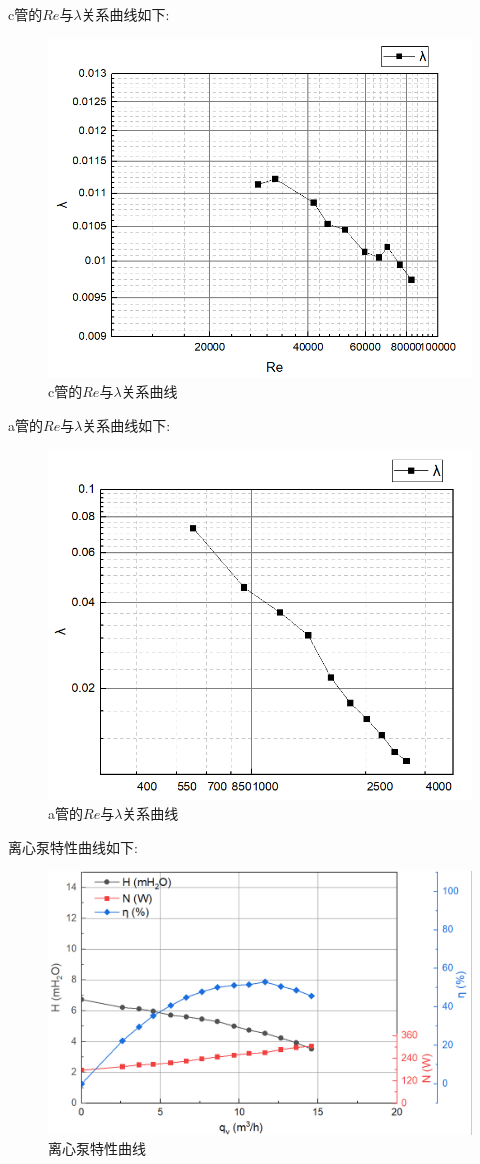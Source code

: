 \documentclass[a4paper,UTF8]{ctexrep}
\theoremstyle{plain}
\theoremstyle{definition}
\numberwithin{equation}{chapter}
\begin{document}
c管的$Re$与$\lambda$关系曲线如下:
\begin{figure}[h]
    \centering
    \includegraphics[width=0.6\linewidth]{imagee.png}
    \caption{c管的$Re$与$\lambda$关系曲线}
    \label{fig:enter-label}
\end{figure}
\newpage
a管的$Re$与$\lambda$关系曲线如下:
\begin{figure}[h]
    \centering
    \includegraphics[width=0.7\linewidth]{ihumage.png}
    \caption{a管的$Re$与$\lambda$关系曲线}
    \label{fig:enter-label}
\end{figure}

离心泵特性曲线如下:

\begin{figure}[h]
    \centering
    \includegraphics[width=0.7\linewidth]{hio.png}
    \caption{离心泵特性曲线}
    \label{fig:enter-label}
\end{figure}
\end{document}
